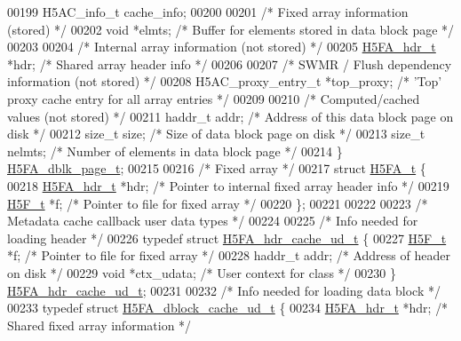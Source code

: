 \begin{DoxyCode}
00199     H5AC\_info\_t cache\_info;
00200 
00201     \textcolor{comment}{/* Fixed array information (stored) */}
00202     \textcolor{keywordtype}{void}        *elmts;         \textcolor{comment}{/* Buffer for elements stored in data block page */}
00203 
00204     \textcolor{comment}{/* Internal array information (not stored) */}
00205     \hyperlink{struct_h5_f_a__hdr__t}{H5FA\_hdr\_t}    *hdr;         \textcolor{comment}{/* Shared array header info                     */}
00206 
00207     \textcolor{comment}{/* SWMR / Flush dependency information (not stored) */}
00208     H5AC\_proxy\_entry\_t *top\_proxy;      \textcolor{comment}{/* 'Top' proxy cache entry for all array entries */}
00209 
00210     \textcolor{comment}{/* Computed/cached values (not stored) */}
00211     haddr\_t     addr;           \textcolor{comment}{/* Address of this data block page on disk      */}
00212     \textcolor{keywordtype}{size\_t}      size;           \textcolor{comment}{/* Size of data block page on disk              */}
00213     \textcolor{keywordtype}{size\_t}      nelmts;         \textcolor{comment}{/* Number of elements in data block page        */}
00214 \} \hyperlink{struct_h5_f_a__dbk__page__t}{H5FA\_dblk\_page\_t};
00215 
00216 \textcolor{comment}{/* Fixed array */}
00217 \textcolor{keyword}{struct }\hyperlink{struct_h5_f_a__t}{H5FA\_t} \{
00218     \hyperlink{struct_h5_f_a__hdr__t}{H5FA\_hdr\_t}  *hdr;           \textcolor{comment}{/* Pointer to internal fixed array header info  */}
00219     \hyperlink{struct_h5_f__t}{H5F\_t}      *f;              \textcolor{comment}{/* Pointer to file for fixed array              */}
00220 \};
00221 
00222 
00223 \textcolor{comment}{/* Metadata cache callback user data types */}
00224 
00225 \textcolor{comment}{/* Info needed for loading header */}
00226 \textcolor{keyword}{typedef} \textcolor{keyword}{struct }\hyperlink{struct_h5_f_a__hdr__cache__ud__t}{H5FA\_hdr\_cache\_ud\_t} \{
00227     \hyperlink{struct_h5_f__t}{H5F\_t}      *f;              \textcolor{comment}{/* Pointer to file for fixed array */}
00228     haddr\_t    addr;            \textcolor{comment}{/* Address of header on disk */}
00229     \textcolor{keywordtype}{void}       *ctx\_udata;      \textcolor{comment}{/* User context for class */}
00230 \} \hyperlink{struct_h5_f_a__hdr__cache__ud__t}{H5FA\_hdr\_cache\_ud\_t};
00231 
00232 \textcolor{comment}{/* Info needed for loading data block */}
00233 \textcolor{keyword}{typedef} \textcolor{keyword}{struct }\hyperlink{struct_h5_f_a__dblock__cache__ud__t}{H5FA\_dblock\_cache\_ud\_t} \{
00234     \hyperlink{struct_h5_f_a__hdr__t}{H5FA\_hdr\_t} *hdr;            \textcolor{comment}{/* Shared fixed array information       */}

\end{DoxyCode}
